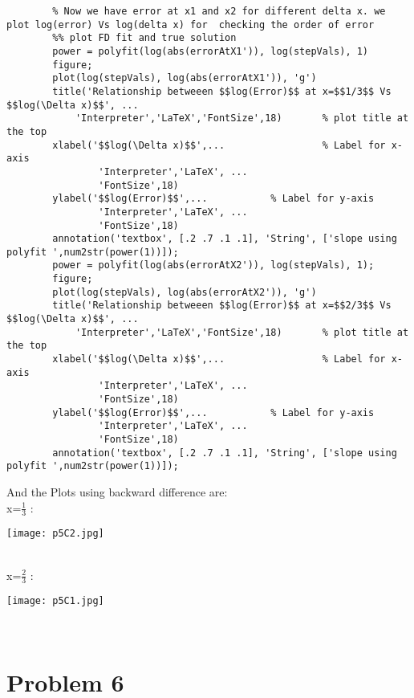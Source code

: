 \documentclass{article}
\begin{document}
\begin{lstlisting}
        % Now we have error at x1 and x2 for different delta x. we plot log(error) Vs log(delta x) for  checking the order of error
        %% plot FD fit and true solution
        power = polyfit(log(abs(errorAtX1')), log(stepVals), 1)
        figure;
        plot(log(stepVals), log(abs(errorAtX1')), 'g')
        title('Relationship betweeen $$log(Error)$$ at x=$$1/3$$ Vs $$log(\Delta x)$$', ...
            'Interpreter','LaTeX','FontSize',18)       % plot title at the top
        xlabel('$$log(\Delta x)$$',...                 % Label for x-axis
                'Interpreter','LaTeX', ...
                'FontSize',18)
        ylabel('$$log(Error)$$',...           % Label for y-axis
                'Interpreter','LaTeX', ...
                'FontSize',18)
        annotation('textbox', [.2 .7 .1 .1], 'String', ['slope using polyfit ',num2str(power(1))]);
        power = polyfit(log(abs(errorAtX2')), log(stepVals), 1);
        figure;
        plot(log(stepVals), log(abs(errorAtX2')), 'g')
        title('Relationship betweeen $$log(Error)$$ at x=$$2/3$$ Vs $$log(\Delta x)$$', ...
            'Interpreter','LaTeX','FontSize',18)       % plot title at the top
        xlabel('$$log(\Delta x)$$',...                 % Label for x-axis
                'Interpreter','LaTeX', ...
                'FontSize',18)
        ylabel('$$log(Error)$$',...           % Label for y-axis
                'Interpreter','LaTeX', ...
                'FontSize',18)
        annotation('textbox', [.2 .7 .1 .1], 'String', ['slope using polyfit ',num2str(power(1))]);

    \end{lstlisting}
    And the Plots using backward difference are:\\
    x=$\frac{1}{3}$ :\\
     \centerline{\texttt{[image: p5C2.jpg]}}\\
     x=$\frac{2}{3}$ :\\
     \centerline{\texttt{[image: p5C1.jpg]}}\\

     \newpage
     \section{Problem 6}
\end{document}
